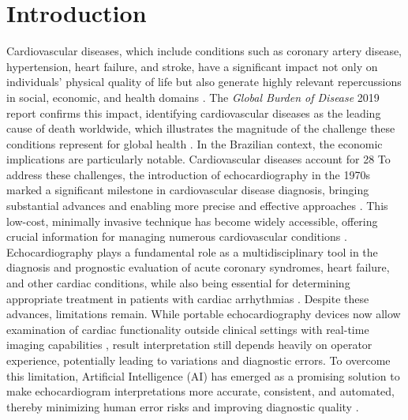 \documentclass[a4paper,fleqn]{cas-dc}
\begin{document}
\maketitle

\section{Introduction}

Cardiovascular diseases, which include conditions such as coronary artery disease, hypertension, heart failure, and stroke, have a significant impact not only on individuals' physical quality of life but also generate highly relevant repercussions in social, economic, and health domains \cite{Stevens2018}. The \textit{Global Burden of Disease} 2019 report confirms this impact, identifying cardiovascular diseases as the leading cause of death worldwide, which illustrates the magnitude of the challenge these conditions represent for global health \cite{https://doi.org/10.6069/1d4y-yq37}.
In the Brazilian context, the economic implications are particularly notable. Cardiovascular diseases account for 28%
To address these challenges, the introduction of echocardiography in the 1970s marked a significant milestone in cardiovascular disease diagnosis, bringing substantial advances and enabling more precise and effective approaches \cite{haley_2018}. This low-cost, minimally invasive technique has become widely accessible, offering crucial information for managing numerous cardiovascular conditions \cite{Mancuso2014}. Echocardiography plays a fundamental role as a multidisciplinary tool in the diagnosis and prognostic evaluation of acute coronary syndromes, heart failure, and other cardiac conditions, while also being essential for determining appropriate treatment in patients with cardiac arrhythmias \cite{Mancuso2014}.
Despite these advances, limitations remain. While portable echocardiography devices now allow examination of cardiac functionality outside clinical settings with real-time imaging capabilities \cite{Xiao}, result interpretation still depends heavily on operator experience, potentially leading to variations and diagnostic errors. To overcome this limitation, Artificial Intelligence (AI) has emerged as a promising solution to make echocardiogram interpretations more accurate, consistent, and automated, thereby minimizing human error risks and improving diagnostic quality \cite{Alsharqi2018}.
\end{document}
